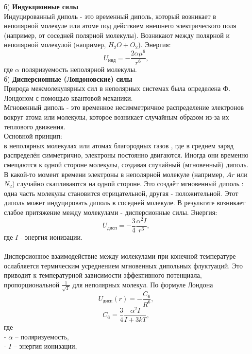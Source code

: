 \documentclass[a4paper]{article}
\numberwithin{equation}{subsection} %
\begin{document}
б) \textbf{Индукционные  силы}\\
Индуцированный диполь - это временный диполь, который возникает в неполярной молекуле или атоме под действием внешнего электрического поля (например, от соседней полярной молекулы).
Возникают между полярной и неполярной молекулой (например, $H_2O + O_2$). Энергия:
\begin{equation}
      U_{\text{инд}} = -\frac{2\alpha \mu^6}{r^6},
\end{equation}
где $\alpha$ поляризуемость неполярной молекулы.\\
б) \textbf{Дисперсионные (Лондоновские)  силы}\\
Природа межмолекулярных сил в неполярных системах была определена Ф. Лондоном с помощью квантовой механики. \\
Мгновенный диполь - это временное несимметричное распределение электронов вокруг атома или молекулы, которое возникает случайным образом из-за их теплового движения. \\
Основной принцип:\\
в неполярных молекулах или атомах благородных газов , где в среднем заряд распределён симметрично, электроны постоянно двигаются. Иногда они временно смещаются к одной стороне молекулы, создавая случайный (мгновенный) диполь. В какой-то момент времени электроны в неполярной молекуле (например, $Ar$ или $N_2$) случайно скапливаются на одной стороне.
Это создаёт мгновенный диполь : одна часть молекулы становится отрицательной, другая - положительной.
Этот диполь может индуцировать диполь в соседней молекуле.
В результате возникает слабое притяжение между молекулами - дисперсионные силы. Энергия:
\begin{equation}
      U_{\text{дисп}} = -\frac{3}{4} \frac{\alpha^2 I}{r^6},
\end{equation}
где $I$ - энергия ионизации.\\
\\
Дисперсионное взаимодействие между молекулами при конечной температуре ослабляется термическим усреднением мгновенных дипольных флуктуаций. Это приводит к температурной зависимости эффективного потенциала, пропорциональной $\frac{1}{\sqrt{T}}$ для неполярных молекул.
По формуле Лондона
\begin{equation}
U_{\text{дисп}}(r) = -\frac{C_6}{R^6} ,
\end{equation}
\begin{equation}
C_6 = \frac{3}{4} \frac{\alpha^2I}{I + 3kT},
\end{equation}
где\\
- $\alpha$ -- поляризуемость,\\
- $I$ -- энергия ионизации,\\
\end{document}
